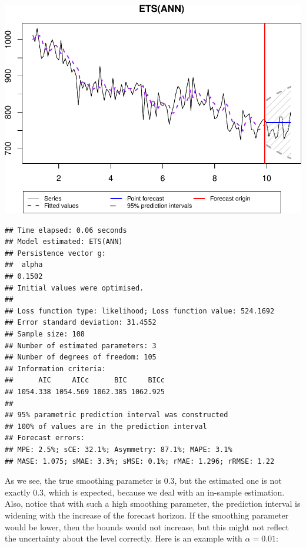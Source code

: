 \documentclass[
]{book}
\newenvironment{Shaded}{\begin{snugshade}}{\end{snugshade}}
\newcommand{\AttributeTok}[1]{\textcolor[rgb]{0.77,0.63,0.00}{#1}}
\newcommand{\ConstantTok}[1]{\textcolor[rgb]{0.00,0.00,0.00}{#1}}
\newcommand{\DecValTok}[1]{\textcolor[rgb]{0.00,0.00,0.81}{#1}}
\newcommand{\FloatTok}[1]{\textcolor[rgb]{0.00,0.00,0.81}{#1}}
\newcommand{\FunctionTok}[1]{\textcolor[rgb]{0.00,0.00,0.00}{#1}}
\newcommand{\NormalTok}[1]{#1}
\newcommand{\OtherTok}[1]{\textcolor[rgb]{0.56,0.35,0.01}{#1}}
\newcommand{\SpecialCharTok}[1]{\textcolor[rgb]{0.00,0.00,0.00}{#1}}
\newcommand{\StringTok}[1]{\textcolor[rgb]{0.31,0.60,0.02}{#1}}
\theoremstyle{definition}
\theoremstyle{definition}
\theoremstyle{definition}
\theoremstyle{definition}
\theoremstyle{remark}
\begin{document}
\includegraphics{adam_files/figure-latex/ETSANNExample-1.pdf}

\begin{verbatim}
## Time elapsed: 0.06 seconds
## Model estimated: ETS(ANN)
## Persistence vector g:
##  alpha 
## 0.1502 
## Initial values were optimised.
## 
## Loss function type: likelihood; Loss function value: 524.1692
## Error standard deviation: 31.4552
## Sample size: 108
## Number of estimated parameters: 3
## Number of degrees of freedom: 105
## Information criteria:
##      AIC     AICc      BIC     BICc 
## 1054.338 1054.569 1062.385 1062.925 
## 
## 95% parametric prediction interval was constructed
## 100% of values are in the prediction interval
## Forecast errors:
## MPE: 2.5%; sCE: 32.1%; Asymmetry: 87.1%; MAPE: 3.1%
## MASE: 1.075; sMAE: 3.3%; sMSE: 0.1%; rMAE: 1.296; rRMSE: 1.22
\end{verbatim}

As we see, the true smoothing parameter is 0.3, but the estimated one is not exactly 0.3, which is expected, because we deal with an in-sample estimation. Also, notice that with such a high smoothing parameter, the prediction interval is widening with the increase of the forecast horizon. If the smoothing parameter would be lower, then the bounds would not increase, but this might not reflect the uncertainty about the level correctly. Here is an example with \(\alpha=0.01\):

\begin{Shaded}
\end{Shaded}
\end{document}
